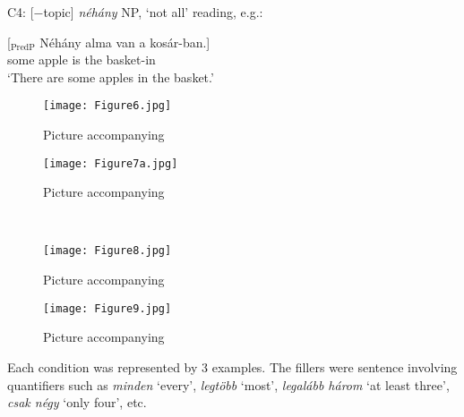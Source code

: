 \documentclass[output=paper]{langscibook}
\begin{document}

\vspace{1ex}

\noindent C4: [$-$topic] \textit{néhány} NP, `not all' reading, e.g.:

\ea
\gll \label{kis-zet:alma}[$_\text{PredP}$ Néhány alma van a kosár-ban.]\\ 
{} some apple is the basket-in\\ 
\glt ‘There are some apples in the basket.’
\z


\begin{figure}[h]
\RawFloats
\centering
\begin{minipage}[b]{0.49\textwidth}
    \centering
    \texttt{[image: Figure6.jpg]}
    \caption{Picture accompanying }
    \label{kis-zet:c1}
\end{minipage}
\begin{minipage}[b]{0.49\textwidth}
    \centering
    \texttt{[image: Figure7a.jpg]}
    \caption{Picture accompanying }
    \label{kis-zet:c2}
\end{minipage}
~
\begin{minipage}[b]{0.49\textwidth}
    \centering
    \texttt{[image: Figure8.jpg]}
    \caption{Picture accompanying }
    \label{kis-zet:c3}
\end{minipage}
\begin{minipage}[b]{0.49\textwidth}
    \centering
    \texttt{[image: Figure9.jpg]}
    \caption{Picture accompanying }
    \label{kis-zet:c4}
\end{minipage}
\end{figure}

Each condition was represented by 3 examples. The fillers were sentence involving quantifiers such as  \textit{minden} `every',  \textit{legtöbb} `most',  \textit{legalább három} `at least three', \textit{csak négy} `only four', etc.
\end{document}
